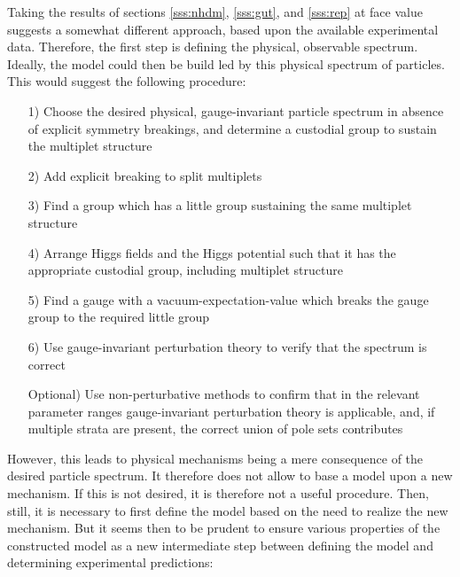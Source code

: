 \documentclass[final,12pt,3p,longtitle]{elsarticle}
\newcommand*{\1}{1\!\!\!\bot}
\begin{document}
Taking the results of sections \ref{sss:nhdm}, \ref{sss:gut}, and \ref{sss:rep} at face value suggests a somewhat different approach, based upon the available experimental data. Therefore, the first step is defining the physical, observable spectrum. Ideally, the model could then be build led by this physical spectrum of particles. This would suggest the following procedure:
\begin{itemize}
 \item[1)] Choose the desired physical, gauge-invariant particle spectrum in absence of explicit symmetry breakings, and determine a custodial group to sustain the multiplet structure
 \item[2)] Add explicit breaking to split multiplets
 \item[3)] Find a group which has a little group sustaining the same multiplet structure \cite{O'Raifeartaigh:1986vq}
 \item[4)] Arrange Higgs fields and the Higgs potential such that it has the appropriate custodial group, including multiplet structure \cite{O'Raifeartaigh:1986vq}
 \item[5)] Find a gauge with a vacuum-expectation-value which breaks the gauge group to the required little group
 \item[6)] Use gauge-invariant perturbation theory to verify that the spectrum is correct
 \item[Optional)] Use non-perturbative methods to confirm that in the relevant parameter ranges gauge-invariant perturbation theory is applicable, and, if multiple strata are present, the correct union of pole sets contributes
\end{itemize}
However, this leads to physical mechanisms being a mere consequence of the desired particle spectrum. It therefore does not allow to base a model upon a new mechanism. If this is not desired, it is therefore not a useful procedure. Then, still, it is necessary to first define the model based on the need to realize the new mechanism. But it seems then to be prudent to ensure various properties of the constructed model as a new intermediate step between defining the model and determining experimental predictions:
\end{document}
